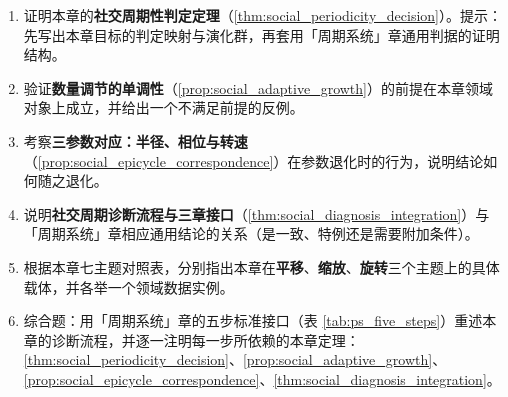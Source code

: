 \begin{enumerate}[leftmargin=3em, label=\textbf{题 \arabic*}]
    \item 证明本章的\textbf{社交周期性判定定理}（\ref{thm:social_periodicity_decision}）。提示：先写出本章目标的判定映射与演化群，再套用「周期系统」章通用判据的证明结构。

    \item 验证\textbf{数量调节的单调性}（\ref{prop:social_adaptive_growth}）的前提在本章领域对象上成立，并给出一个不满足前提的反例。

    \item 考察\textbf{三参数对应：半径、相位与转速}（\ref{prop:social_epicycle_correspondence}）在参数退化时的行为，说明结论如何随之退化。

    \item 说明\textbf{社交周期诊断流程与三章接口}（\ref{thm:social_diagnosis_integration}）与「周期系统」章相应通用结论的关系（是一致、特例还是需要附加条件）。

    \item 根据本章七主题对照表，分别指出本章在\textbf{平移}、\textbf{缩放}、\textbf{旋转}三个主题上的具体载体，并各举一个领域数据实例。

    \item 综合题：用「周期系统」章的五步标准接口（表 \ref{tab:ps_five_steps}）重述本章的诊断流程，并逐一注明每一步所依赖的本章定理：\ref{thm:social_periodicity_decision}、\ref{prop:social_adaptive_growth}、\ref{prop:social_epicycle_correspondence}、\ref{thm:social_diagnosis_integration}。
\end{enumerate}


